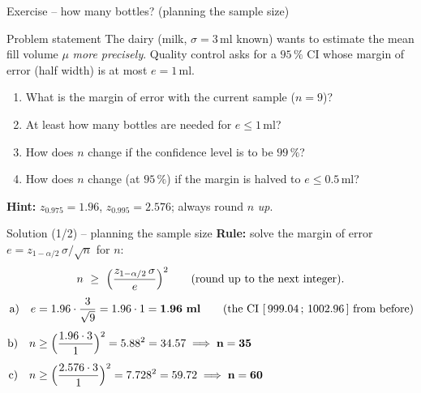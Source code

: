 \documentclass[aspectratio=169,11pt]{beamer}
\begin{document}
\begin{frame}{Exercise -- how many bottles? (planning the sample size)}
  \begin{block}{Problem statement}
    The dairy (milk, $\sigma=3$\,ml known) wants to estimate the mean fill
    volume $\mu$ \emph{more precisely}. Quality control asks for a $95\,\%$ CI
    whose margin of error (half width) is at most $e=1$\,ml.
  \end{block}
  \begin{enumerate}\setlength{\itemsep}{2pt}
    \item[a)] What is the margin of error with the current sample ($n=9$)?
    \item[b)] At least how many bottles are needed for $e\le1$\,ml?
    \item[c)] How does $n$ change if the confidence level is to be $99\,\%$?
    \item[d)] How does $n$ change (at $95\,\%$) if the margin is halved to
              $e\le0.5$\,ml?
  \end{enumerate}
  \textbf{Hint:} $z_{0.975}=1.96$, $z_{0.995}=2.576$; always round $n$
  \emph{up}.
\end{frame}

\begin{frame}{Solution (1/2) -- planning the sample size}
  \textbf{Rule:} solve the margin of error $e=z_{1-\alpha/2}\,\sigma/\sqrt n$
  for $n$:
  \[
    n\ \ge\ \Bigl(\frac{z_{1-\alpha/2}\,\sigma}{e}\Bigr)^{2}
    \qquad\text{(round up to the next integer).}
  \]
  \begin{align*}
    \text{a)}\quad e &= 1.96\cdot\frac{3}{\sqrt9}=1.96\cdot1=\mathbf{1.96\ ml}
       \qquad(\text{the CI }[\,999.04\,;\,1002.96\,]\text{ from before})\\[4pt]
    \text{b)}\quad n &\ge \Bigl(\frac{1.96\cdot3}{1}\Bigr)^{2}=5.88^{2}=34.57
       \;\Longrightarrow\;\mathbf{n=35}\\[4pt]
    \text{c)}\quad n &\ge \Bigl(\frac{2.576\cdot3}{1}\Bigr)^{2}=7.728^{2}=59.72
       \;\Longrightarrow\;\mathbf{n=60}
  \end{align*}
\end{frame}
\end{document}

